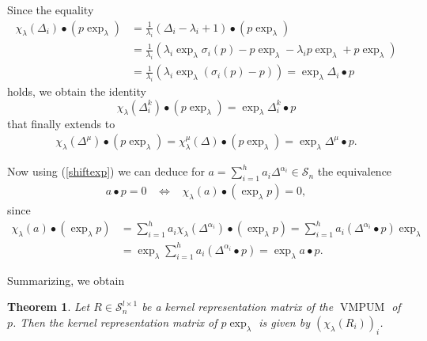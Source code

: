 \documentclass[a4paper,10pt]{article}
\newtheorem{Th}{Theorem}[section]
\theoremstyle{nonumberplain}
\newtheorem{proof}{Proof}
\DeclareMathOperator{\VMPUM}{VMPUM}
\begin{document}
Since the equality
\begin{align*}
 \chi_{\lambda}(\Delta_i) \bullet (p \exp_\lambda) & = \frac{1}{\lambda_i}(\Delta_i - \lambda_i + 1) \bullet (p \exp_\lambda) \\
 &= \frac{1}{\lambda_i} \left( \lambda_i \exp_\lambda \sigma_i(p) - p \exp_\lambda  - \lambda_i p \exp_\lambda + p \exp_\lambda \right) \\
 & = \frac{1}{\lambda_i} \left( \lambda_i \exp_\lambda ( \sigma_i(p) - p ) \right) 
 = \exp_\lambda \Delta_i \bullet  p
\end{align*}
holds, we obtain the identity
$$  
\chi_{\lambda}(\Delta_i^k) \bullet (p \exp_\lambda) = \exp_\lambda \Delta_i^k \bullet  p
$$
that finally extends to
\begin{align}\label{shiftexp}
\chi_{\lambda}(\Delta^\mu) \bullet (p \exp_\lambda) = \chi_{\lambda}^\mu(\Delta) \bullet (p \exp_\lambda) = \exp_\lambda \Delta^\mu \bullet  p.
\end{align}

Now using (\ref{shiftexp}) we can deduce for $a = \sum_{i=1}^h a_i \Delta^{\alpha_i} \in \mathcal{S}_n$ 
the equivalence
\begin{align}\label{shifteinD}
 a \bullet p = 0 \;\;\; \Leftrightarrow \;\;\; \chi_\lambda(a) \bullet (\exp_\lambda p) = 0,
\end{align}
since
\begin{align*}
 \chi_\lambda(a) \bullet (\exp_\lambda p)  & = \sum_{i=1}^h a_i \chi_\lambda(\Delta^{\alpha_i} )\bullet (\exp_\lambda p)
 = \sum_{i=1}^h a_i (\Delta^{\alpha_i} \bullet p) \exp_\lambda \\
& =\exp_\lambda  \sum_{i=1}^h a_i (\Delta^{\alpha_i} \bullet p) =\exp_\lambda a \bullet p .
\end{align*}

Summarizing, we obtain
\begin{Th}
 Let $R \in \mathcal{S}_n^{l \times 1}$ be a kernel representation matrix of the $\VMPUM$ of $p$. Then the kernel representation matrix of $p \exp_\lambda$ is given by $(\chi_\lambda(R_{i}))_{i}$.
\end{Th}
\end{document}
